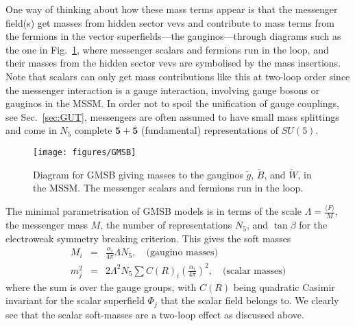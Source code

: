 \documentclass[notes.tex]{subfiles}
\begin{document}
One way of thinking about how these mass terms appear is that the messenger field(s) get masses from hidden sector vevs and contribute to mass terms from the fermions in the vector superfields---the gauginos---through diagrams such as the one in Fig.~\ref{fig:GMSB}, where messenger scalars and fermions run in the loop, and their masses from the hidden sector vevs are symbolised by the mass insertions. Note that scalars can only get mass contributions like this at two-loop order since the messenger interaction is a gauge interaction, involving gauge bosons or gauginos in the MSSM. In order not to spoil the unification of gauge couplings, see Sec.~\ref{sec:GUT}, messengers are often assumed to have small mass splittings and come in $N_5$ complete $\mathbf{5} + \overline{\mathbf{5}}$ (fundamental) representations of $SU(5)$.

\begin{figure}[h!]
\begin{center}
\texttt{[image: figures/GMSB]} 
\caption{Diagram for GMSB giving masses to the gauginos $\tilde g$, $\tilde B$, and $\tilde W$, in the MSSM. The messenger scalars and fermions run in the loop.}
\label{fig:GMSB}
\end{center}
\end{figure}

The minimal parametrisation of GMSB models is in terms of the scale $\Lambda = \frac{\langle F\rangle}{M}$, the messenger mass $M$, the number of representations $N_5$, and $\tan\beta$ for the electroweak symmetry breaking criterion. This gives the soft masses
\begin{eqnarray}
M_i &=& \frac{\alpha_i}{4\pi}\Lambda N_5,\quad\text{(gaugino masses)}\label{eq:GMSBgauginomass}\\
m_j^2 &=& 2\Lambda^2 N_5 \sum C(R)_i\left(\frac{\alpha_i}{4\pi}\right)^2,\quad\text{(scalar masses)}
\end{eqnarray}
where the sum is over the gauge groups, with $C(R)$ being quadratic Casimir invariant for the scalar superfield $\Phi_j$ that the scalar field belongs to. We clearly see that the scalar soft-masses are a two-loop effect as discussed above. 
\end{document}
